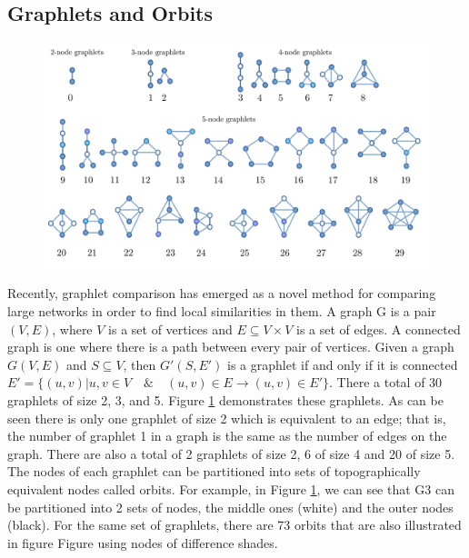 \documentclass[]{article}
\begin{document}
\subsection{Graphlets and Orbits}
\begin{figure}
    \centering
    \includegraphics[width=\textwidth]{figures/graphlets.jpg}
    \caption{}
    \label{fig_graphlets}
\end{figure}
Recently, graphlet comparison has emerged as
a novel method for comparing large networks in
order to find local similarities in them. A
graph G is a pair $(V,E)$, where $V$ is a set of
vertices and $E \subseteq V\times V$ is a set of
edges. A connected graph is one where there is
a path between every pair of vertices.
Given a graph $G(V, E)$ and $S \subseteq V$,
then $G'(S, E')$ is a graphlet if and only if
it is connected $E' = \{(u, v) | u, v \in V \quad \&
\quad (u, v) \in E \rightarrow (u, v) \in E'\}$. 
There a total of 30 graphlets
of size 2, 3, and 5.  Figure \ref{fig_graphlets}
demonstrates these graphlets. 
As can be seen there is only one graphlet
of size 2 which is equivalent to an edge; that
is, the number of graphlet 1 in a graph is the
same as the number of edges on the graph. There
are also a total of 2 graphlets of size 2, 6
of size 4 and 20 of size 5. The nodes of each graphlet
can be partitioned into sets of topographically equivalent
nodes called orbits. For  example, in  Figure 
\ref{fig_graphlets}, we can see that G3 can be
partitioned into 2 sets of nodes, the middle ones
(white) and the outer nodes (black). 
For the same set of graphlets,
there are 73 orbits that are also illustrated in
figure  Figure using nodes of difference shades.
\end{document}
